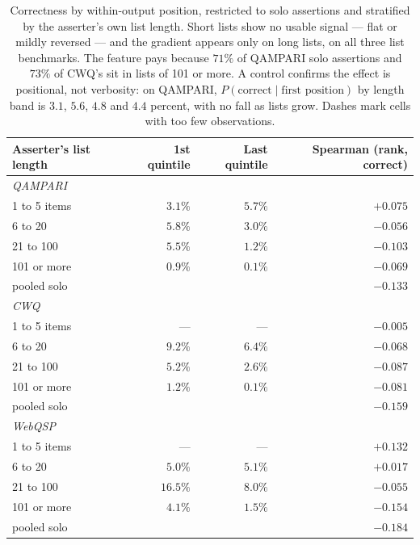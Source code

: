 \documentclass[11pt]{article}
\begin{document}
\begin{table}[t]
  \caption{Correctness by within-output position, restricted to solo assertions and stratified by the asserter's own list length. Short lists show no usable signal --- flat or mildly reversed --- and the gradient appears only on long lists, on all three list benchmarks. The feature pays because $71\%$ of QAMPARI solo assertions and $73\%$ of CWQ's sit in lists of 101 or more. A control confirms the effect is positional, not verbosity: on QAMPARI, $P(\mathrm{correct} \mid \text{first position})$ by length band is $3.1$, $5.6$, $4.8$ and $4.4$ percent, with no fall as lists grow. Dashes mark cells with too few observations.}
  \label{tab:rank}
  \centering
  \begin{tabular}{lrrr}
    \toprule
    Asserter's list length & 1st quintile & Last quintile & Spearman (rank, correct) \\
    \midrule
    \multicolumn{4}{l}{\emph{QAMPARI}} \\
    1 to 5 items & $3.1\%$ & $5.7\%$ & $+0.075$ \\
    6 to 20      & $5.8\%$ & $3.0\%$ & $-0.056$ \\
    21 to 100    & $5.5\%$ & $1.2\%$ & $-0.103$ \\
    101 or more  & $0.9\%$ & $0.1\%$ & $-0.069$ \\
    pooled solo  &         &         & $-0.133$ \\
    \midrule
    \multicolumn{4}{l}{\emph{CWQ}} \\
    1 to 5 items & --- & --- & $-0.005$ \\
    6 to 20      & $9.2\%$ & $6.4\%$ & $-0.068$ \\
    21 to 100    & $5.2\%$ & $2.6\%$ & $-0.087$ \\
    101 or more  & $1.2\%$ & $0.1\%$ & $-0.081$ \\
    pooled solo  &         &         & $-0.159$ \\
    \midrule
    \multicolumn{4}{l}{\emph{WebQSP}} \\
    1 to 5 items & --- & --- & $+0.132$ \\
    6 to 20      & $5.0\%$ & $5.1\%$ & $+0.017$ \\
    21 to 100    & $16.5\%$ & $8.0\%$ & $-0.055$ \\
    101 or more  & $4.1\%$ & $1.5\%$ & $-0.154$ \\
    pooled solo  &         &         & $-0.184$ \\
    \bottomrule
  \end{tabular}
\end{table}
\end{document}
